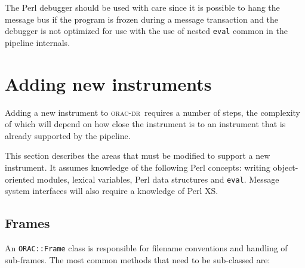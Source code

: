 \documentclass[twoside,11pt]{article}
\renewcommand{\_}{\texttt{\symbol{95}}}
\newcommand{\Oracdr}{\textsc{orac-dr}}
\begin{document}
The Perl debugger should be used with care since it is possible to
hang the message bus if the program is frozen during a message
transaction and the debugger is not optimized for use with the use of nested
\texttt{eval} common in the pipeline internals.

\section{Adding new instruments}

Adding a new instrument to \Oracdr\ requires a number of steps, the
complexity of which will depend on how close the instrument is to an
instrument that is already supported by the pipeline.

This section describes the areas that must be modified to support a
new instrument. It assumes knowledge of the following Perl concepts:
writing object-oriented modules, lexical variables, Perl data
structures and \texttt{eval}. Message system interfaces will also
require a knowledge of Perl XS.


\subsection{Frames}

An \texttt{ORAC::Frame} class is responsible for filename conventions
and handling of sub-frames. The most common methods that need to be
sub-classed are:
\end{document}
